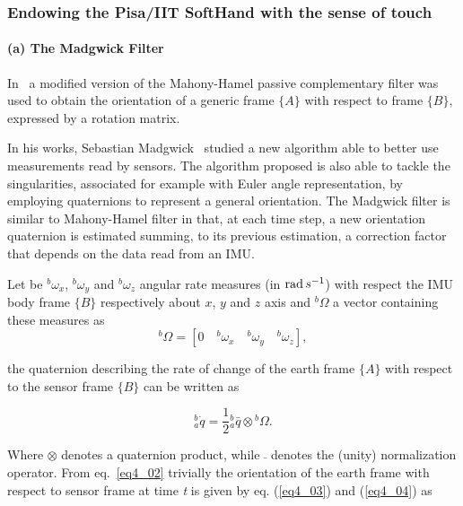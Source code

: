 
\subsubsection{Endowing the Pisa/IIT SoftHand with the sense of touch}
\label{sec:SenseOfTouch}


\paragraph{(a) The Madgwick Filter}



In~\cite{Santaera:ICRA:2015} a modified version of the Mahony-Hamel passive complementary filter was used to obtain the orientation of a generic frame $\{ A \}$ with respect to frame $\{ B \}$, expressed by a rotation matrix.

In his works, Sebastian Madgwick~\cite{MadgwickMARG} studied a new algorithm able to better use measurements read by sensors. The algorithm proposed is also able to tackle the singularities, associated for example with Euler angle representation, by employing quaternions to represent a general orientation. The Madgwick filter is similar to Mahony-Hamel filter in that, at each time step, a new orientation quaternion is estimated summing, to its previous estimation, a correction factor that depends on the data read from an IMU.

Let be ${^b\omega_x}$, ${^b\omega_y}$ and ${^b\omega_z}$ angular rate measures (in $\operatorname{rad} s^{-1}$) with respect the IMU body frame $\{ B\}$ respectively about $x$, $y$ and $z$ axis and $^{b}\Omega$ a vector containing these measures as
\begin{equation}
\label{eq4_01}
^b \Omega = [ 0 \quad {^b\omega_x} \quad {^b\omega_y} \quad {^b\omega_z} ],
\end{equation}

\noindent the quaternion describing the rate of change of the earth frame $\{ A \}$ with respect to the sensor frame $\{ B \}$ can be written as

\begin{equation}
\label{eq4_02}
^b_a\dot{q} = \frac{1}{2} {^b_a \bar{q}}  \otimes {^b\Omega}.
\end{equation}

\noindent Where $\otimes$ denotes a quaternion product, while $\bar{}$ denotes the (unity) normalization operator. From eq.~\eqref{eq4_02} trivially the orientation of the earth frame with respect to sensor frame at time \textit{t} is given by eq. (\ref{eq4_03}) and (\ref{eq4_04}) as

